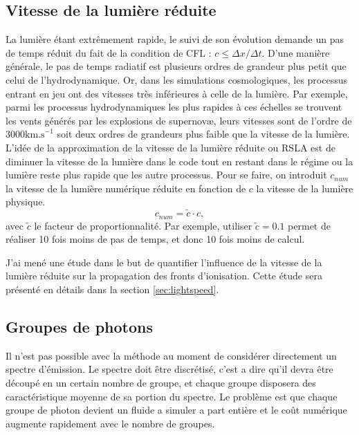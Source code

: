\subsection{Vitesse de la lumière réduite}
\label{sec:RSLA}

La lumière étant extrêmement rapide, le suivi de son évolution demande un pas de temps réduit du fait de la condition de \ac{CFL} : $ c \leq \Delta x / \Delta t $.
D'une manière générale, le pas de temps radiatif est plusieurs ordres de grandeur plus petit que celui de l'hydrodynamique.
Or, dans les simulations cosmologiques, les processus entrant en jeu ont des vitesses très inférieures à celle de la lumière.
Par exemple, parmi les processus hydrodynamiques les plus rapides à ces échelles se trouvent les vents générés par les explosions de supernovæ, leurs vitesses sont de l'ordre de $3000 \mathrm{km.s}^{-1}$ soit deux ordres de grandeurs plus faible que la vitesse de la lumière.
L'idée de la approximation de la vitesse de la lumière réduite ou \ac{RSLA} est de diminuer la vitesse de la lumière dans le code tout en restant dans le régime ou la lumière reste plus rapide que les autre processus.
Pour se faire, on introduit $c_{num}$ la vitesse de la lumière numérique réduite en fonction de $c$ la vitesse de la lumière physique.
\begin{equation}
c_{num} = \tilde{c} \cdot{c},
\end{equation}
avec $\tilde{c}$ le facteur de proportionnalité. 
Par exemple, utiliser $\tilde{c}=0.1$ permet de réaliser 10 fois moins de pas de temps, et donc 10 fois moins de calcul.

J'ai mené une étude dans le but de quantifier l'influence de la vitesse de la lumière réduite sur la propagation des fronts d'ionisation.
Cette étude sera présenté en détails dans la section \ref{sec:lightspeed}.


\subsection{Groupes de photons}
\label{sec:groupedephotons}

Il n'est pas possible avec la méthode au moment de considérer directement un spectre d'émission.
Le spectre doit être discrétisé, c'est a dire qu'il devra être découpé en un certain nombre de groupe, et chaque groupe disposera des caractéristique moyenne de sa portion du spectre.
Le problème est que chaque groupe de photon devient un fluide a simuler a part entière et le coût numérique augmente rapidement avec le nombre de groupes. 


